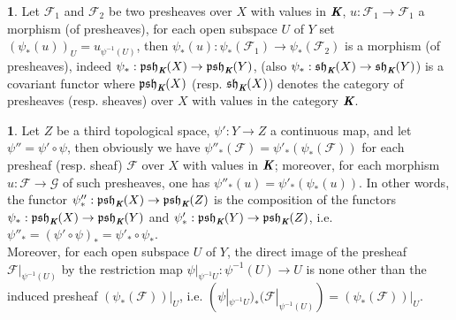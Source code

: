 \documentclass[12pt]{amsart}
\newcommand{\psh}{\operatorname{\mathfrak{psh}}}
\newcommand{\sh}{\operatorname{\mathfrak{sh}}}
\theoremstyle{definition}
\newtheorem{bk}[proposition]{}
\begin{document}
\begin{bk}\label{I: 3.4.2} Let $\mathscr{F}_{1}$ and $\mathscr{F}_{2}$ be two presheaves over $X$ with values in $\emph{\textbf{K}}$, $u:\mathscr{F}_{1}\rightarrow\mathscr{F}_{1}$ a morphism (of presheaves), for each open subspace $U$ of $Y$ set $(\psi_{\ast}(u))_{U}=u_{\psi^{-1}(U)}$, then $\psi_{\ast}(u):\psi_{\ast}(\mathscr{F}_{1})
\rightarrow\psi_{\ast}(\mathscr{F}_{2})$ is a morphism (of presheaves), indeed $\psi_{\ast}:\psh_{\emph{\textbf{K}}}(X)
\rightarrow\psh_{\emph{\textbf{K}}}(Y)$, (also $\psi_{\ast}:\sh_{\emph{\textbf{K}}}(X)
\rightarrow\sh_{\emph{\textbf{K}}}(Y)$) is a covariant functor  where $\psh_{\emph{\textbf{K}}}(X)$ (resp. $\sh_{\emph{\textbf{K}}}(X)$) denotes the category of presheaves (resp. sheaves) over $X$ with values in the category
$\emph{\textbf{K}}$.\\
\end{bk}

\begin{bk}\label{I: 3.4.3} Let $Z$ be a third topological space, $\psi':Y\rightarrow Z$ a continuous map, and let $\psi''=\psi'\circ\psi$, then obviously we have $\psi''_{\ast}(\mathscr{F})=\psi'_{\ast}(\psi_{\ast}(\mathscr{F}))$ for each presheaf (resp. sheaf) $\mathscr{F}$ over $X$ with values in $\emph{\textbf{K}}$; moreover, for each morphism $u:\mathscr{F}\rightarrow\mathscr{G}$ of such presheaves, one has $\psi''_{\ast}(u)=\psi'_{\ast}(\psi_{\ast}(u))$. In other words, the functor $\psi''_{\ast}:\psh_{\emph{\textbf{K}}}(X)
\rightarrow\psh_{\emph{\textbf{K}}}(Z)$ is the composition of the functors $\psi_{\ast}:\psh_{\emph{\textbf{K}}}(X)
\rightarrow\psh_{\emph{\textbf{K}}}(Y)$ and $\psi'_{\ast}:\psh_{\emph{\textbf{K}}}(Y)
\rightarrow\psh_{\emph{\textbf{K}}}(Z)$, i.e. $\psi''_{\ast}=(\psi'\circ\psi)_{\ast}=\psi'_{\ast}\circ\psi_{\ast}$. \\
Moreover, for each open subspace $U$ of $Y$, the direct image of the presheaf $\mathscr{F}|_{\psi^{-1}(U)}$ by the restriction map $\psi|_{\psi^{-1}U}:\psi^{-1}(U)\rightarrow U$ is none other than the induced presheaf $(\psi_{\ast}(\mathscr{F}))|_{U}$, i.e. $(\psi|_{\psi^{-1}U})_{\ast}(\mathscr{F}|_{\psi^{-1}(U)})=
(\psi_{\ast}(\mathscr{F}))|_{U}$.  \\
\end{bk}
\end{document}
